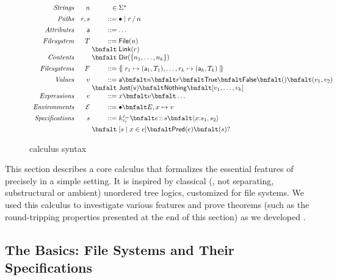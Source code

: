 \begin{figure}
\[
\begin{array}{rr@{\;}r@{\;}l}
\textit{Strings}        & n & \in & \Sigma^{\ast} \\[1ex]
\textit{Paths}          & r,s & \bnfdef & \PNil \mid \PCons{r}{n} \\[1ex]
\textit{Attributes}     & \att  & \bnfdef & \dots\\[1ex]
\textit{Filesystem}     & T  & \bnfdef & \File{n} \\
                        &    & \bnfalt & \Link{r}\\
\textit{Contents}       &    & \bnfalt & \Dir{ \Set{n_1,\dots,n_k} }\\[1ex]
\textit{Filesystems}    & F & \bnfdef & \Map{ r_1 \mapsto (\att_1,T_1), \dots, r_k \mapsto (\att_k,T_k) }\\[1ex]
\textit{Values}         & v & \bnfdef & \att \bnfalt n \bnfalt r \bnfalt \True \bnfalt \False \bnfalt () \bnfalt (v_1,v_2) \\
                        &   & \bnfalt & \Just{v} \bnfalt \Nothing \bnfalt \List{v_1,\dots,v_k}\\
\textit{Expressions}    & e & \bnfdef & x \bnfalt v \bnfalt \dots \\[1ex]
\textit{Environments}   & \Env & \bnfdef & \ENil \bnfalt E,x\mapsto v \\[1ex]
\textit{Specifications} & s & \bnfdef & \Sk 
                              \bnfalt \SPath{e}{s}
                              \bnfalt \SPair{x}{s_1}{s_2}\\[1ex]
                        &   & \bnfalt & \SComp{s}{x}{e}
                              \bnfalt \SPred{e}
                              \bnfalt \SOption{s}
\end{array}
\]
\label{fig:calculus-syntax}
\caption{\forest{} calculus syntax}
\end{figure}

This section describes a core calculus that formalizes the essential
features of \forest{} precisely in a simple setting. It is inspired by
classical (\ie{}, not separating, substructural or ambient) unordered
tree logics, customized for file systems. We used this calculus to
investigate various features and prove theorems (such as the
round-tripping properties presented at the end of this section) as we
developed \forest{}.

\subsection{The Basics: File Systems and Their Specifications}

